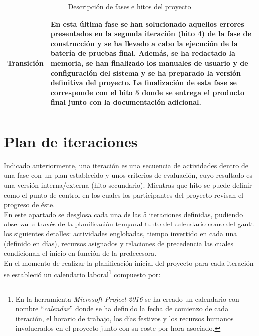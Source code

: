 \documentclass[12pt,a4paper, twoside]{report}
\begin{document}
\begin{longtable}{|m{4cm}|m{2cm}|}
		\multicolumn{1}{|p{3cm}|}{\textbf{Transición}} & \multicolumn{1}{p{13cm}|}{En esta última fase se han solucionado aquellos errores presentados en la segunda iteración (hito 4) de la fase de construcción y se ha llevado a cabo la ejecución de la batería de pruebas final. Además, se ha redactado la memoria, se han finalizado los manuales de usuario y de configuración del sistema y se ha preparado la versión definitiva del proyecto. La finalización de esta fase se corresponde con el \textbf{hito 5} donde se entrega el producto final junto con la documentación adicional.}
		\\ \hline

		\caption{Descripción de fases e hitos del proyecto}
	\end{longtable}
	
	\section{Plan de iteraciones}
				
	Indicado anteriormente, una iteración es una secuencia de actividades dentro de una fase con un plan establecido y unos criterios de evaluación, cuyo resultado es una versión interna/externa (hito secundario). Mientras que hito se puede definir como el punto de control en los cuales los participantes del proyecto revisan el progreso de éste. \\
	
	En este apartado se desglosa cada una de las 5 iteraciones definidas, pudiendo observar a través de la planificación temporal tanto del calendario como del \gls{gantt} los siguientes detalles: actividades englobadas, tiempo invertido en cada una (definido en días), recursos asignados y relaciones de precedencia las cuales condicionan el inicio en función de la predecesora. \\
	
	En el momento de realizar la planificación inicial del proyecto para cada iteración se estableció un calendario laboral\footnote{En la herramienta \textit{Microsoft Project 2016} se ha creado un calendario con nombre ``\textit{calendar}'' donde se ha definido la fecha de comienzo de cada iteración, el horario de trabajo, los días festivos y los recursos humanos involucrados en el proyecto junto con su coste por hora asociado.} compuesto por:
	
\end{document}
